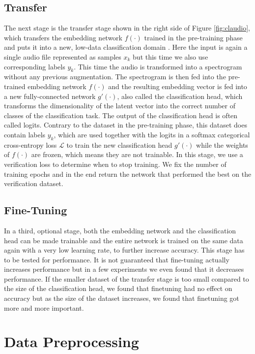 \subsection{Transfer}

The next stage is the transfer stage shown in the right side of Figure \ref{fig:claudio}, which transfers the embedding network $f(\cdot)$ trained in the pre-training phase and puts it into a new, low-data classification domain . Here the input is again a single audio file represented as samples $x_k$ but this time we also use corresponding labels $y_k$. This time the audio is transformed into a spectrogram without any previous augmentation. The spectrogram is then fed into the pre-trained embedding network $f(\cdot)$ and the resulting embedding vector is fed into a new fully-connected network $g'(\cdot)$, also called the classification head, which transforms the dimensionality of the latent vector into the correct number of classes of the classification task. The output of the classification head is often called logits. Contrary to the dataset in the pre-training phase, this dataset does contain labels $y_k$, which are used together with the logits in a softmax categorical cross-entropy loss $\mathcal{L}$ to train the new classification head $g'(\cdot)$ while the weights of $f(\cdot)$ are frozen, which means they are not trainable. In this stage, we use a verification loss to determine when to stop training. We fix the number of training epochs and in the end return the network that performed the best on the verification dataset.

\subsection{Fine-Tuning}

In a third, optional stage, both the embedding network and the classification head can be made trainable and the entire network is trained on the same data again with a very low learning rate, to further increase accuracy. This stage has to be tested for performance. It is not guaranteed that fine-tuning actually increases performance but in a few experiments we even found that it decreases performance. If the smaller dataset of the transfer stage is too small compared to the size of the classification head, we found that finetuning had no effect on accuracy but as the size of the dataset increases, we found that finetuning got more and more important.

\section{Data Preprocessing}\label{sec:preprocessing}

